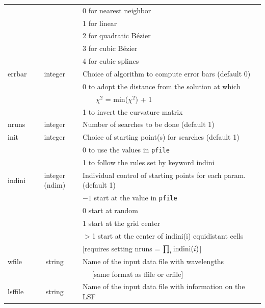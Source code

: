 \documentclass[12pt]{article}
\begin{document}
\begin{table}
\begin{tabular}{lcl}
	&                      &   0 for nearest neighbor \\
	&                      &   1 for linear  \\
	&                      &   2 for quadratic B\'ezier \\	
	&                      &   3 for cubic B\'ezier \\	
	&                      &   4 for cubic splines  \\	
errbar    &    integer            & Choice of algorithm to compute error bars (default 0) \\
	&                      & 0 to adopt the distance from the solution at which \\
	&                      &  ~~~	$\chi^2$ = min($\chi^2$) + 1 \\
	&                      & 1 to invert the curvature matrix \\
nruns     &     integer           &  Number of searches to be done (default 1) \\	  
init      &   integer            & Choice of starting point(s) for searches (default 1) \\
	&                      &  0 to use the values in {\tt pfile} \\
	&                      &    1 to follow the rules set by keyword indini \\
indini    &  integer (ndim)      &  Individual control of starting points for each param. (default 1) \\
        &                      & $-1$ start at the value in {\tt pfile} \\
        &                      &  0 start at random \\
        &                      &    1 start at the grid center \\
        &                      &    $>$1 start at the center of indini(i) equidistant cells \\
        &                      &    [requires setting nruns = $\prod_i {\rm indini}(i)$] \\
wfile   &     string           & Name of the input data file with wavelengths \\
	&                      &   ~~ [same format as ffile or erfile] \\
lsffile &     string           & Name of the input data file with information on the LSF \\

\end{tabular}
\end{table}
\end{document}
